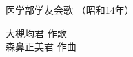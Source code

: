 \documentclass[10pt,b5j]{tarticle} %
\begin{document}
\begin{minipage}[c]{0.7\hsize} %
    \begin{center}
        {\LARGE
            医学部学友会歌 %
        }
        {\small 
            （昭和14年） %
        }
    \end{center}
\end{minipage}
\begin{minipage}[c]{0.3\hsize} %
    \begin{flushright} %
        大槻均君 作歌\\森鼻正美君 作曲 %
    \end{flushright}
\end{minipage}
\end{document}
